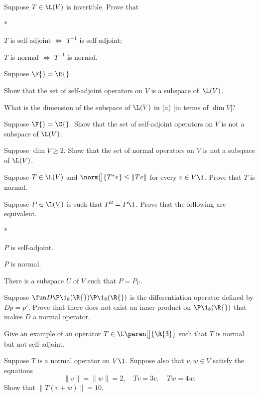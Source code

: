 \exercise
Suppose $T \in \L(V)$ is invertible. Prove that
\begin{subtheorem}*
\item
$T$ is self-adjoint $\iff$ $T^{-1}$ is self-adjoint;
\item
$T$ is normal $\iff$ $T^{-1}$ is normal.
\end{subtheorem}
\exercisesubtheoremend


\exercise
Suppose $\F{} = \R{}$.
\begin{subtheorem}
\item
Show that the set of self-adjoint operators on $V$ is a subspace of~$\L(V)$.
\item
What is the dimension of the subspace of $\L(V)$ in (a) [in terms of $\dim V$]?
\end{subtheorem}
\exercisesubtheoremend


\exercise
Suppose $\F{} = \C{}$. Show that the set of self-adjoint
operators on $V$ is not a subspace of $\L(V)$.


\exercise
Suppose $\dim V \ge 2$. Show that the set of normal operators on $V$ is not a
subspace of $\L(V)$.


\exercise
Suppose $T \in \L(V)$ and
$
\norm[\big]{T^*v } \le \| Tv \|$
for every $v \in V\1$. Prove that $T$ is normal.


\exercise
Suppose $P \in \L(V)$ is such that $P^2 = P\1$.  Prove that the following are equivalent.\label{7proj}
\begin{subtheorem}*
\item
$P$ is self-adjoint.
\item
$P$ is normal.
\item
There is a subspace $U$ of $V$ such that $P = P_{\!U}$.
\end{subtheorem}
\exercisesubtheoremend


\exercise
Suppose $\fun D {\P\1_8(\R{})} {\P\1_8(\R{})}$ is the differentiation operator defined by $Dp = p'\!$. Prove that there does not exist an inner product on $\P\1_8(\R{})$ that makes $D$ a  normal operator.


\exercise
Give an example of an operator $T \in \L\paren[\big]{\R{3}}$ such that $T$ is normal but not self-adjoint.


\exercise
Suppose $T$ is a normal operator on $V\1$. Suppose also that $v, w \in V$ satisfy the equations
\[
\|v\| = \|w \| = 2, \quad Tv = 3v, \quad Tw = 4w.
\]
Show that $\|T(v + w)\| = 10$.


